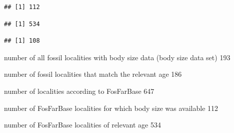 \documentclass[]{article}
\newenvironment{Shaded}{\begin{snugshade}}{\end{snugshade}}
\newcommand{\KeywordTok}[1]{\textcolor[rgb]{0.13,0.29,0.53}{\textbf{{#1}}}}
\newcommand{\DataTypeTok}[1]{\textcolor[rgb]{0.13,0.29,0.53}{{#1}}}
\newcommand{\DecValTok}[1]{\textcolor[rgb]{0.00,0.00,0.81}{{#1}}}
\newcommand{\FloatTok}[1]{\textcolor[rgb]{0.00,0.00,0.81}{{#1}}}
\newcommand{\StringTok}[1]{\textcolor[rgb]{0.31,0.60,0.02}{{#1}}}
\newcommand{\NormalTok}[1]{{#1}}
\begin{document}
\begin{Shaded}
\end{Shaded}

\begin{verbatim}
## [1] 112
\end{verbatim}

\begin{Shaded}
\end{Shaded}

\begin{verbatim}
## [1] 534
\end{verbatim}

\begin{Shaded}
\end{Shaded}

\begin{verbatim}
## [1] 108
\end{verbatim}

number of all fossil localities with body size data (body size data set)
193

number of fossil localities that match the relevant age 186

number of localities according to FosFarBase 647

number of FosFarBase localities for which body size was available 112

number of FosFarBase localities of relevant age 534
\end{document}
